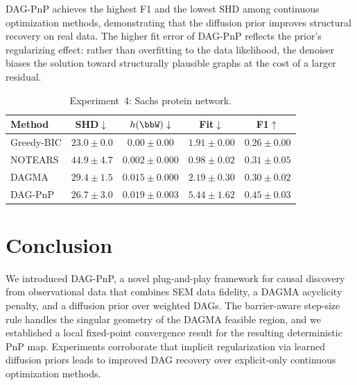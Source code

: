 \documentclass[conference]{IEEEtran}
\begin{document}
    DAG-PnP achieves the highest F1 and the lowest SHD among
    continuous optimization methods, demonstrating that the diffusion prior improves structural recovery on real data. The higher fit error of DAG-PnP reflects the prior's
    regularizing effect: rather than overfitting to the data likelihood, the denoiser biases the solution toward structurally plausible graphs at the cost of a larger residual. 
\begin{table}[ht]
  \centering
  \caption{Experiment~4: Sachs protein network.}
  \label{tab:exp4}
  \scriptsize
  \setlength{\tabcolsep}{3pt}
  \renewcommand{\arraystretch}{0.95}
  \begin{tabular}{lcccc}
    \toprule
    Method & SHD$\downarrow$ & $h(\bbW)\downarrow$ & Fit$\downarrow$ & F1$\uparrow$ \\
    \midrule
    Greedy-BIC & $\mathbf{23.0} \pm 0.0$ & $\mathbf{0.00} \pm 0.00$ & $1.91 \pm 0.00$ & $0.26 \pm 0.00$ \\
    NOTEARS    & $44.9 \pm 4.7$ & $0.002 \pm 0.000$ & $\mathbf{0.98} \pm 0.02$ & $0.31 \pm 0.05$ \\
    DAGMA      & $29.4 \pm 1.5$ & $0.015 \pm 0.000$ & $2.19 \pm 0.30$ & $0.30 \pm 0.02$ \\
    DAG-PnP     & $26.7 \pm 3.0$ & $0.019 \pm 0.003$ & $5.44 \pm 1.62$ & $\mathbf{0.45} \pm 0.03$ \\
    \bottomrule
  \end{tabular}
\end{table}
	
	\section{Conclusion}
	\label{sec:conclusion}
	
	We introduced DAG-PnP, a novel plug-and-play framework for causal discovery from observational data that combines SEM data fidelity, a DAGMA acyclicity penalty, and a diffusion prior over weighted DAGs. The barrier-aware step-size rule handles the singular geometry of the DAGMA feasible region, and we established a local fixed-point convergence result for the resulting deterministic PnP map. Experiments corroborate that implicit regularization via learned diffusion priors leads to improved DAG recovery over explicit-only continuous optimization methods.
	
\end{document}
